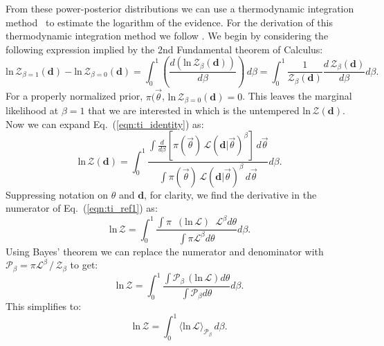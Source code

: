 From these power-posterior distributions we can use a thermodynamic integration method~\citep{lartillot2006computing,friel2008marginal} to estimate the logarithm of the evidence. For the derivation of this thermodynamic integration method we follow \citep{annis2019thermodynamic}.
We begin by considering the following expression implied by the 2nd Fundamental theorem of Calculus:
\begin{equation}\label{eqn:ti_identity}
    \mathrm{ln} \, \mathcal{Z}_{\beta=1}\left(\mathbf{d}\right) - \mathrm{ln} \, \mathcal{Z}_{\beta=0}\left(\mathbf{d}\right) = \int^1_0 \left(\frac{d\left(\mathrm{ln} \, \mathcal{Z}_\beta \left(\mathbf{d}\right) \right)}{d\beta}\right) \, d\beta = \int^1_0 \frac{1}{\mathcal{Z}_\beta \left(\mathbf{d}\right)} \frac{d \, \mathcal{Z}_\beta \left(\mathbf{d}\right)}{d\beta} d\beta.
\end{equation}
For a properly normalized prior, $\pi(\vec{\theta}$, $\mathrm{ln} \, \mathcal{Z}_{\beta=0} \left(\mathbf{d}\right) = 0$. This leaves the marginal likelihood at $\beta=1$ that we are interested in which is the untempered $\mathrm{ln} \, \mathcal{Z} \left(\mathbf{d}\right)$. Now we can expand Eq.~(\ref{eqn:ti_identity}) as:
\begin{equation}
    \mathrm{ln} \, \mathcal{Z} \left(\mathbf{d}\right) = \int_0^1 \frac{\int \frac{d}{d\beta} \left[\pi\left(\vec{\theta}\right) \, \mathcal{L} \left(\mathbf{d}|\vec{\theta} \right)^\beta \right]\, d\vec{\theta} }{\int \pi\left(\vec{\theta}\right) \, \mathcal{L}\left(\mathbf{d}|\vec{\theta} \right)^\beta \, d\vec{\theta}} d\beta.
\end{equation}\label{eqn:ti_ref1}
Suppressing notation on $\theta$ and $\mathbf{d}$, for clarity, we find the derivative in the numerator of Eq.~(\ref{eqn:ti_ref1}) as:
\begin{equation}
    \mathrm{ln} \, \mathcal{Z} = \int^1_0 \frac{\int \pi \, \, \, \left(\mathrm{ln} \, \mathcal{L}\right) \, \, \, \mathcal{L}^{\beta} d\theta}{\int \pi \mathcal{L}^{\beta} d\theta} d\beta.
\end{equation}
Using Bayes' theorem we can replace the numerator and denominator with $\mathcal{P}_\beta = \pi \mathcal{L}^\beta \, / \, \mathcal{Z}_\beta$ to get:
\begin{equation}
    \mathrm{ln} \, \mathcal{Z} = \int^1_0 \frac{\int \mathcal{P}_\beta \, \left(\mathrm{ln} \, \mathcal{L}\right) d\theta}{\int \mathcal{P}_\beta   d\theta} d\beta.
\end{equation}
This simplifies to:
\begin{equation}
   \mathrm{ln} \, \mathcal{Z} = \int^1_0 \langle \mathrm{ln} \, \mathcal{L} \rangle_{\mathcal{P}_\beta} \, d\beta.
\end{equation}\label{eq:thermoint}
